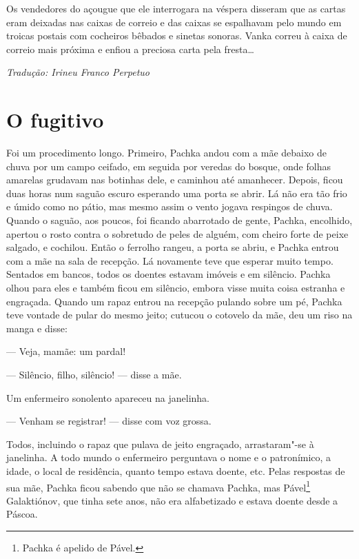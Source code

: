 Os vendedores do açougue que ele interrogara na véspera disseram que as
cartas eram deixadas nas caixas de correio e das caixas se espalhavam
pelo mundo em troicas postais com cocheiros bêbados e sinetas sonoras.
Vanka correu à caixa de correio mais próxima e enfiou a preciosa carta
pela fresta\ldots{}


\medskip

{\footnotesize\hfill\emph{Tradução: Irineu Franco Perpetuo}}

\chapter{O fugitivo}\label{part7} \label{part7}

Foi um procedimento longo. Primeiro, Pachka andou com a mãe debaixo de
chuva por um campo ceifado, em seguida por veredas do bosque, onde
folhas amarelas grudavam nas botinhas dele, e caminhou até amanhecer.
Depois, ficou duas horas num saguão escuro esperando uma porta se abrir. Lá não era tão frio e úmido como no pátio, mas mesmo assim o vento
jogava respingos de chuva. Quando o saguão, aos poucos, foi ficando
abarrotado de gente, Pachka, encolhido, apertou o rosto contra o
sobretudo de peles de alguém, com cheiro forte de peixe salgado, e
cochilou. Então o ferrolho rangeu, a porta se abriu, e Pachka entrou com
a mãe na sala de recepção. Lá novamente teve que esperar muito tempo.
Sentados em bancos, todos os doentes estavam imóveis e em silêncio.
Pachka olhou para eles e também ficou em silêncio, embora visse muita
coisa estranha e engraçada. Quando um rapaz entrou na recepção pulando
sobre um pé, Pachka teve vontade de pular do mesmo jeito; cutucou o
cotovelo da mãe, deu um riso na manga e disse:

--- Veja, mamãe: um pardal!

--- Silêncio, filho, silêncio! --- disse a mãe.

Um enfermeiro sonolento apareceu na janelinha.

--- Venham se registrar! --- disse com voz grossa.

Todos, incluindo o rapaz que pulava de jeito engraçado, arrastaram"-se à
janelinha. A todo mundo o enfermeiro perguntava o nome e o patronímico,
a idade, o local de residência, quanto tempo estava doente, etc. Pelas
respostas de sua mãe, Pachka ficou sabendo que não se chamava Pachka,
mas Pável\footnote{Pachka é apelido de Pável.} Galaktiónov, que tinha
sete anos, não era alfabetizado e estava doente desde a Páscoa.

